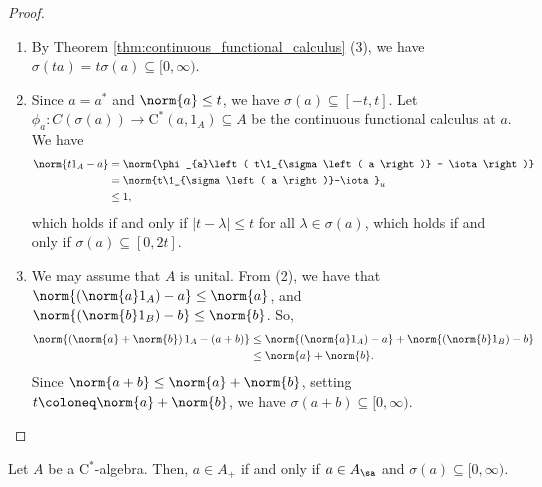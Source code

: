 \begin{proof}\hfill
  \begin{enumerate}[(1)]
    \item By Theorem \ref{thm:continuous_functional_calculus} (3), we have $\sigma\left( ta \right) = t\sigma\left( a \right)\subseteq [0,\infty)$.
    \item Since $a = a^{\ast}$ and $\norm{a}\leq t$, we have $\sigma\left( a \right)\subseteq [-t,t]$. Let $\phi_a\colon C\left( \sigma\left( a \right) \right)\rightarrow \mathrm{C}^{\ast}\left( a,1_A \right)\subseteq A$ be the continuous functional calculus at $a$. We have
      \begin{align*}
        \norm{t1_A - a} &= \norm{\phi_{a}\left( t\1_{\sigma\left( a \right)} - \iota \right)}\\
                        &= \norm{t\1_{\sigma\left( a \right)}-\iota}_{u}\\
                        &\leq 1,
      \end{align*}
      which holds if and only if $\left\vert t - \lambda \right\vert \leq t$ for all $\lambda\in \sigma\left( a \right)$, which holds if and only if $\sigma\left( a \right)\subseteq [0,2t]$.
    \item We may assume that $A$ is unital. From (2), we have that $\norm{\left( \norm{a}1_A \right) - a}\leq \norm{a}$, and $\norm{\left( \norm{b}1_B \right) - b}\leq \norm{b}$. So,
      \begin{align*}
        \norm{\left( \norm{a} + \norm{b} \right)1_A - \left( a+b \right)} &\leq \norm{\left( \norm{a}1_A \right)-a} + \norm{\left( \norm{b}1_B \right) - b}\\
                                                                          &\leq \norm{a} + \norm{b}.
      \end{align*}
      Since $\norm{a +b}\leq \norm{a} + \norm{b}$, setting $t \coloneq \norm{a} + \norm{b}$, we have $\sigma\left( a + b \right)\subseteq [0,\infty)$.
  \end{enumerate}
\end{proof}
\begin{theorem}
  Let $A$ be a $\mathrm{C}^{\ast}$-algebra. Then, $a\in A_{+}$ if and only if $a\in A_{\sa}$ and $\sigma\left( a \right)\subseteq [0,\infty)$.
\end{theorem}
